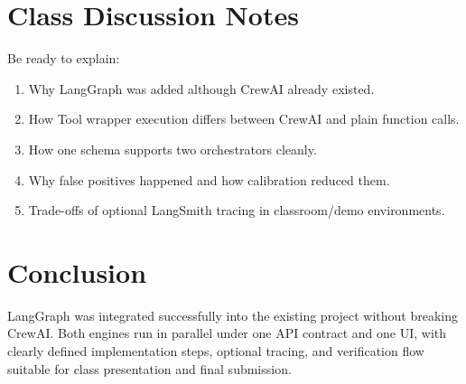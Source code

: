 \documentclass[11pt,a4paper]{article}
\begin{document}
\section{Class Discussion Notes}
Be ready to explain:
\begin{enumerate}[leftmargin=1.5em]
  \item Why LangGraph was added although CrewAI already existed.
  \item How Tool wrapper execution differs between CrewAI and plain function calls.
  \item How one schema supports two orchestrators cleanly.
  \item Why false positives happened and how calibration reduced them.
  \item Trade-offs of optional LangSmith tracing in classroom/demo environments.
\end{enumerate}

\section{Conclusion}
LangGraph was integrated successfully into the existing project without breaking CrewAI. Both engines run in parallel under one API contract and one UI, with clearly defined implementation steps, optional tracing, and verification flow suitable for class presentation and final submission.
\end{document}
